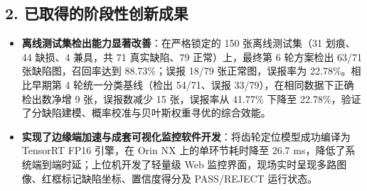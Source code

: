 \subsection*{2. 已取得的阶段性创新成果}
\begin{itemize}
    \item \textbf{离线测试集检出能力显著改善}：在严格锁定的 150 张离线测试集（31 划痕、44 缺损、4 兼具，共 71 真实缺陷、79 正常）上，最终第 6 轮方案检出 63/71 张缺陷图，召回率达到 88.73\%；误报 18/79 张正常图，误报率为 22.78\%。相比早期第 4 轮统一分类基线（检出 54/71、误报 33/79），在相同数据下正确检出数净增 9 张，误报数减少 15 张，误报率从 41.77\% 下降至 22.78\%，验证了分缺陷建模、概率校准与贝叶斯权重寻优的综合效能。
    \item \textbf{实现了边缘端加速与成套可视化监控软件开发}：将齿轮定位模型成功编译为 TensorRT FP16 引擎，在 Orin NX 上的单环节耗时降至 26.7 ms，降低了系统端到端时延；上位机开发了轻量级 Web 监控界面，现场实时呈现多路图像、红框标记缺陷坐标、置信度得分及 PASS/REJECT 运行状态。
\end{itemize}
